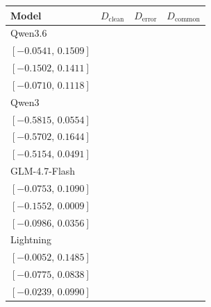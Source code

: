 \begingroup%
\fontsize{10}{11.5}\selectfont%
\setlength{\tabcolsep}{4pt}%
\renewcommand{\arraystretch}{1.08}%
\begin{tabular*}{\linewidth}{@{\extracolsep{\fill}}lccc@{}}
\toprule
Model & \(D_{\mathrm{clean}}\) & \(D_{\mathrm{error}}\) & \(D_{\mathrm{common}}\) \\
\midrule
Qwen3.6 & \begin{tabular}[t]{@{}c@{}}\(0.0477\)\\\([-0.0541,\,0.1509]\)\end{tabular} & \begin{tabular}[t]{@{}c@{}}\(-0.0055\)\\\([-0.1502,\,0.1411]\)\end{tabular} & \begin{tabular}[t]{@{}c@{}}\(0.0211\)\\\([-0.0710,\,0.1118]\)\end{tabular}\\[2pt]
Qwen3 & \begin{tabular}[t]{@{}c@{}}\(-0.2638\)\\\([-0.5815,\,0.0554]\)\end{tabular} & \begin{tabular}[t]{@{}c@{}}\(-0.1974\)\\\([-0.5702,\,0.1644]\)\end{tabular} & \begin{tabular}[t]{@{}c@{}}\(-0.2306\)\\\([-0.5154,\,0.0491]\)\end{tabular}\\[2pt]
GLM-4.7-Flash & \begin{tabular}[t]{@{}c@{}}\(0.0147\)\\\([-0.0753,\,0.1090]\)\end{tabular} & \begin{tabular}[t]{@{}c@{}}\(-0.0774\)\\\([-0.1552,\,0.0009]\)\end{tabular} & \begin{tabular}[t]{@{}c@{}}\(-0.0313\)\\\([-0.0986,\,0.0356]\)\end{tabular}\\[2pt]
Lightning & \begin{tabular}[t]{@{}c@{}}\(0.0717\)\\\([-0.0052,\,0.1485]\)\end{tabular} & \begin{tabular}[t]{@{}c@{}}\(0.0040\)\\\([-0.0775,\,0.0838]\)\end{tabular} & \begin{tabular}[t]{@{}c@{}}\(0.0379\)\\\([-0.0239,\,0.0990]\)\end{tabular}\\[2pt]

\end{tabular*}
